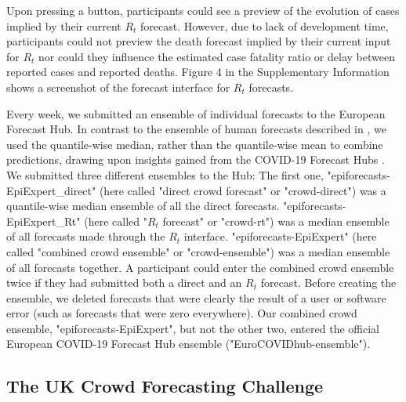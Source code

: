 \documentclass[10pt,a4paper,twocolumn]{article}
\begin{document}
Upon pressing a button, participants could see a preview of the evolution of cases implied by their current $R_t$ forecast. However, due to lack of development time, participants could not preview the death forecast implied by their current input for $R_t$ nor could they influence the estimated case fatality ratio or delay between reported cases and reported deaths. Figure 4 in the Supplementary Information \cite{bosseSupplementaryInformationHuman2023} shows a screenshot of the forecast interface for $R_t$ forecasts. 

Every week, we submitted an ensemble of individual forecasts to the European Forecast Hub. In contrast to the ensemble of human forecasts described in \citet{bosseComparingHumanModelbased2022}, we used the quantile-wise median, rather than the quantile-wise mean to combine predictions, drawing upon insights gained from the COVID-19 Forecast Hubs \citep{rayComparingTrainedUntrained2022}. 
We submitted three different ensembles to the Hub: The first one, "epiforecasts-EpiExpert\_direct" (here called "direct crowd forecast" or "crowd-direct") was a quantile-wise median ensemble of all the direct forecasts. "epiforecasts-EpiExpert\_Rt" (here called "$R_t$ forecast" or "crowd-rt") was a median ensemble of all forecasts made through the $R_t$ interface. "epiforecasts-EpiExpert" (here called "combined crowd ensemble" or "crowd-ensemble") was a median ensemble of all forecasts together. A participant could enter the combined crowd ensemble twice if they had submitted both a direct and an $R_t$ forecast. Before creating the ensemble, we deleted forecasts that were clearly the result of a user or software error (such as forecasts that were zero everywhere). Our combined crowd ensemble, "epiforecasts-EpiExpert", but not the other two, entered the official European COVID-19 Forecast Hub ensemble ("EuroCOVIDhub-ensemble"). 

\subsection*{The UK Crowd Forecasting Challenge}
\end{document}
